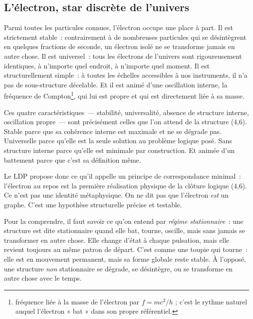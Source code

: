 \documentclass[12pt, a4paper, openright]{book}
\begin{document}
\subsection*{L'électron, star discrète de l'univers}

Parmi toutes les particules connues, l'électron occupe une place à part. Il est strictement stable~: contrairement à de nombreuses particules qui se désintègrent en quelques fractions de seconde, un électron isolé ne se transforme jamais en autre chose. Il est universel~: tous les électrons de l'univers sont rigoureusement identiques, à n'importe quel endroit, à n'importe quel moment. Il est structurellement simple~: à toutes les échelles accessibles à nos instruments, il n'a pas de sous-structure décelable. Et il est animé d'une oscillation interne, la fréquence de Compton\footnote{fréquence liée à la masse de l'électron par $f = mc^2/h$ ; c'est le rythme naturel auquel l'électron « bat » dans son propre référentiel.}, qui lui est propre et qui est directement liée à sa masse.

\medskip

Ces quatre caractéristiques~--- stabilité, universalité, absence de structure interne, oscillation propre~--- sont précisément celles que l'on attend de la structure (4,6). Stable parce que sa cohérence interne est maximale et ne se dégrade pas. Universelle parce qu'elle est la seule solution au problème logique posé. Sans structure interne parce qu'elle est minimale par construction. Et animée d'un battement parce que c'est sa définition même.

\medskip

Le LDP propose donc ce qu'il appelle un principe de correspondance minimal~: l'électron au repos est la première réalisation physique de la clôture logique (4,6). Ce n'est pas une identité métaphysique. On ne dit pas que l'électron \emph{est} un graphe. C'est une hypothèse structurelle précise et testable.

\medskip

Pour la comprendre, il faut savoir ce qu'on entend par \emph{régime stationnaire}~: une structure est dite stationnaire quand elle bat, tourne, oscille, mais sans jamais se transformer en autre chose. Elle change d'état à chaque pulsation, mais elle revient toujours au même patron de départ. C'est comme une toupie qui tourne~: elle est en mouvement permanent, mais sa forme globale reste stable. À l'opposé, une structure \emph{non} stationnaire se dégrade, se désintègre, ou se transforme en autre chose avec le temps.
\end{document}
